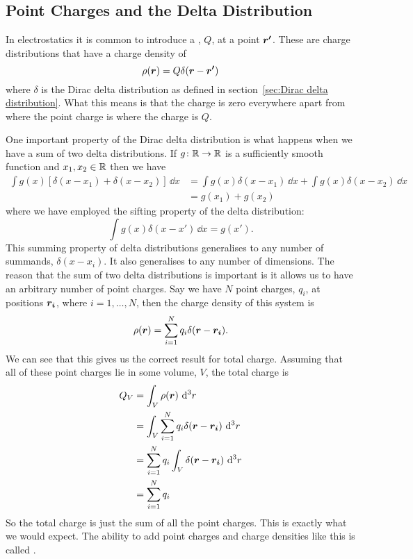     \subsection{Point Charges and the Delta Distribution}
    In electrostatics it is common to introduce a , \(Q\), at a point \(\bm{r'}\).
    These are charge distributions that have a charge density of
    \[\rho(\bm{r}) = Q\delta(\bm{r} - \bm{r'})\]
    where \(\delta\) is the Dirac delta distribution as defined in section~\ref{sec:Dirac delta distribution}.
    What this means is that the charge is zero everywhere apart from where the point charge is where the charge is \(Q\).
    
    One important property of the Dirac delta distribution is what happens when we have a sum of two delta distributions.
    If \(g\colon\mathbb{R}\to\mathbb{R}\) is a sufficiently smooth function and \(x_1, x_2\in\mathbb{R}\) then we have
    \begin{align*}
        \int g(x)[\delta(x - x_1) + \delta(x - x_2)]\,\dd{x} &= \int g(x)\delta(x - x_1)\,\dd{x} + \int g(x)\delta(x - x_2)\,\dd{x}\\
        &= g(x_1) + g(x_2)
    \end{align*}
    where we have employed the sifting property of the delta distribution:
    \[\int g(x)\delta(x - x')\,\dd{x} = g(x').\]
    This summing property of delta distributions generalises to any number of summands, \(\delta(x - x_i)\).
    It also generalises to any number of dimensions.
    The reason that the sum of two delta distributions is important is it allows us to have an arbitrary number of point charges.
    Say we have \(N\) point charges, \(q_i\), at positions \(\bm{r_i}\), where \(i = 1,\dotsc, N\), then the charge density of this system is
    \[\rho(\bm{r}) = \sum_{i=1}^N q_i\delta(\bm{r} - \bm{r_i}).\]
    We can see that this gives us the correct result for total charge.
    Assuming that all of these point charges lie in some volume, \(V\), the total charge is
    \begin{align*}
        Q_V &= \int_V \rho(\bm{r})\,\dd[3]{r}\\
        &= \int_V \sum_{i=1}^N q_i\delta(\bm{r} - \bm{r_i})\,\dd[3]{r}\\
        &= \sum_{i=1}^N q_i \int_V \delta(\bm{r} - \bm{r_i})\,\dd[3]{r}\\
        &= \sum_{i=1}^N q_i
    \end{align*}
    So the total charge is just the sum of all the point charges.
    This is exactly what we would expect.
    The ability to add point charges and charge densities like this is called .
    
